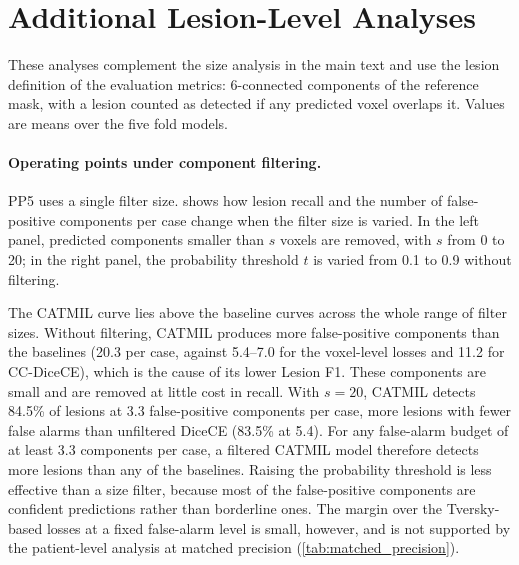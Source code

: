 \section{Additional Lesion-Level Analyses}
\label{appendix:lesion-level-analyses}

These analyses complement the size analysis in the main text and use the
lesion definition of the evaluation metrics: 6-connected components of the reference mask, with
a lesion counted as detected if any predicted voxel overlaps it. Values are
means over the five fold models.

\paragraph{Operating points under component filtering.}
PP5 uses a single filter size.  shows how lesion
recall and the number of false-positive components per case change when
the filter size is varied. In the left panel, predicted components smaller
than $s$ voxels are removed, with $s$ from 0 to 20; in the right panel, the
probability threshold $t$ is varied from 0.1 to 0.9 without filtering.

The CATMIL curve lies above the baseline curves across the whole range of
filter sizes. Without filtering, CATMIL produces more false-positive
components than the baselines (20.3 per case, against 5.4--7.0 for the
voxel-level losses and 11.2 for CC-DiceCE), which is the cause of its lower
Lesion F1. These components are small and are
removed at little cost in recall. With $s = 20$, CATMIL detects 84.5\% of
lesions at 3.3 false-positive components per case, more lesions with fewer
false alarms than unfiltered DiceCE (83.5\% at 5.4). For any false-alarm
budget of at least 3.3 components per case, a filtered CATMIL model
therefore detects more lesions than any of the baselines. Raising the
probability threshold is less effective than a size filter, because most
of the false-positive components are confident predictions rather than
borderline ones. The margin over the Tversky-based losses at a fixed
false-alarm level is small, however, and is not supported by the
patient-level analysis at matched precision (\cref{tab:matched_precision}).


